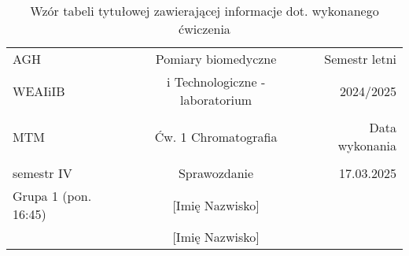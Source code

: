 \documentclass[oneside]{mwart}  %
\begin{document}
\pagestyle{fancy}

\fancyhf{}

\begin{table}[h]
\centering
\caption{Wzór tabeli tytułowej zawierającej informacje dot. wykonanego ćwiczenia}  
\label{tab:Tabela tytułowa}
\begin{tabular}{lcr}
\hline
AGH                  &  Pomiary biomedyczne                 & Semestr letni  \\
WEAIiIB              &  i Technologiczne - laboratorium     &  2024/2025  \\

 & & \\    %
 
MTM                  & Ćw. 1 Chromatografia                 & Data wykonania  \\ 

 & & \\    %
 
semestr IV           & Sprawozdanie                         & 17.03.2025  \\ 
Grupa 1 (pon. 16:45) & [Imię Nazwisko]                      &   \\ 
                     & [Imię Nazwisko]                      &   \\ 
\hline
\end{tabular}
\end{table}

\end{document}
